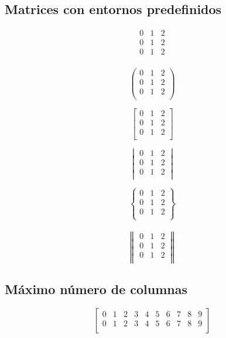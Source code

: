 \documentclass[12pt]{article}
\begin{document}
\newpage

\subsection{Matrices con entornos predefinidos}
\[
\begin{matrix}
0 & 1 & 2 \\
0 & 1 & 2 \\
0 & 1 & 2 \\
\end{matrix}
\]

\[
\begin{pmatrix}
0 & 1 & 2 \\
0 & 1 & 2 \\
0 & 1 & 2 \\
\end{pmatrix}
\]

\[
\begin{bmatrix}
0 & 1 & 2 \\
0 & 1 & 2 \\
0 & 1 & 2 \\
\end{bmatrix}
\]

\[
\begin{vmatrix}
0 & 1 & 2 \\
0 & 1 & 2 \\
0 & 1 & 2 \\
\end{vmatrix}
\]

\[
\begin{Bmatrix}
0 & 1 & 2 \\
0 & 1 & 2 \\
0 & 1 & 2 \\
\end{Bmatrix}
\]
\\
\[
\begin{Vmatrix}
0 & 1 & 2 \\
0 & 1 & 2 \\
0 & 1 & 2 \\
\end{Vmatrix}
\]

\subsection{Máximo número de columnas}
\[
\begin{bmatrix}
0 & 1 & 2 & 3 & 4 & 5 & 6 & 7 & 8 & 9 \\
0 & 1 & 2 & 3 & 4 & 5 & 6 & 7 & 8 & 9 \\
\end{bmatrix}
\]
\end{document}
